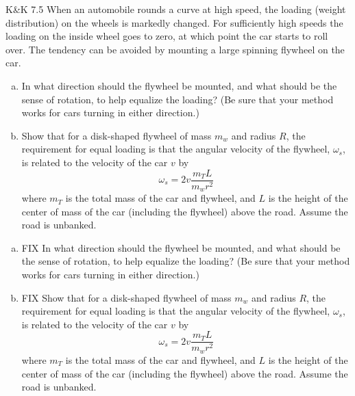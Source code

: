\documentclass{esg8012pset}
\begin{document}
\begin{problem}{K\&K 7.5}
  When an automobile rounds a curve at high speed, the loading (weight distribution) on the wheels is markedly changed. For sufficiently high speeds the loading on the inside wheel goes to zero, at which point the car starts to roll over. The tendency can be avoided by mounting a large spinning flywheel on the car.
  \begin{enumerate}[(a)]
    \item In what direction should the flywheel be mounted, and what should be the sense of rotation, to help equalize the loading? (Be sure that your method works for cars turning in either direction.)
    \item Show that for a disk-shaped flywheel of mass $m_w$ and radius $R$, the requirement for equal loading is that the angular velocity of the flywheel, $\omega_s$, is related to the velocity of the car $v$ by $$\omega_s = 2v\frac{m_T L}{m_w r^2}$$ where $m_T$ is the total mass of the car and flywheel, and $L$ is the height of the center of mass of the car (including the flywheel) above the road. Assume the road is unbanked.
  \end{enumerate}
\end{problem}
\begin{solution}
\begin{enumerate}[(a)]
  \item FIX In what direction should the flywheel be mounted, and what should be the sense of rotation, to help equalize the loading? (Be sure that your method works for cars turning in either direction.)
  \item FIX Show that for a disk-shaped flywheel of mass $m_w$ and radius $R$, the requirement for equal loading is that the angular velocity of the flywheel, $\omega_s$, is related to the velocity of the car $v$ by $$\omega_s = 2v\frac{m_T L}{m_w r^2}$$ where $m_T$ is the total mass of the car and flywheel, and $L$ is the height of the center of mass of the car (including the flywheel) above the road. Assume the road is unbanked.
\end{enumerate}
\end{solution}
\end{document}
